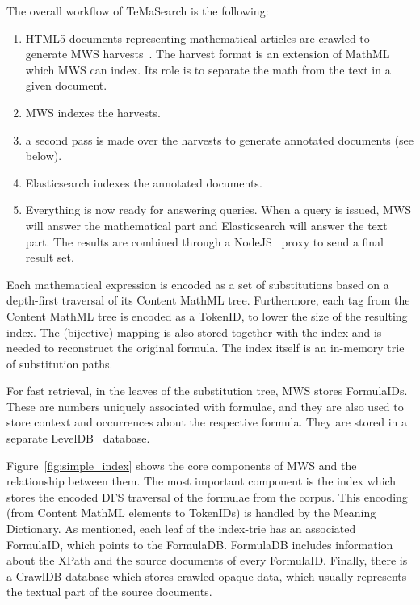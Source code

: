\documentclass[a4paper,oneside]{article}
\def\MWS{\textsf{MWS}\xspace}
\def\tms{\textsf{TeMaSearch}\xspace}
\def\els{\textsf{Elasticsearch}\xspace}
\def\cmml{\textsf{Content MathML}\xspace}
\def\xpath{\textsf{XPath}\xspace}
\def\mathml{\textsf{MathML}\xspace}
\begin{document}
The overall workflow of \tms is the following:
\begin{enumerate}
    \item HTML5 documents representing mathematical articles are
        crawled to generate \MWS harvests~\cite{mwsharvest:online}.
        The \textsf{harvest} format is an extension of \mathml which \MWS can
        index. Its role is to separate the math from the text in a given
        document.
    \item \MWS indexes the harvests.
    \item a second pass is made over the harvests to generate annotated
        documents (see below).
    \item \els indexes the annotated documents.
    \item Everything is now ready for answering queries. When a query is
        issued, \MWS will answer the mathematical part and \els will answer the
        text part.  The results are combined through a
        NodeJS~\cite{nodejs:online} proxy to send a final result set.
\end{enumerate}

Each mathematical expression is encoded as a set of substitutions based
on a depth-first traversal of its \cmml tree.
Furthermore, each tag from the \cmml tree is encoded as a \textsf{TokenID},
to lower the size of the resulting index. The (bijective) mapping is also
stored together with the index and is needed to reconstruct the original
formula. The index itself is an in-memory trie of substitution paths.

For fast retrieval, in the leaves of the substitution tree, \MWS stores
\textsf{FormulaID}s. These are numbers uniquely associated with formulae,
and they are also used to store context and occurrences about the respective
formula. They are stored in a separate LevelDB~\cite{leveldb:online} database.

Figure~\ref{fig:simple_index} shows the core components of \MWS and the
relationship between them. The most important component is the index which
stores the encoded DFS traversal of the formulae from the corpus. This encoding
(from \cmml elements to \textsf{TokenID}s) is handled by the Meaning
Dictionary. As mentioned, each leaf of the index-trie has an associated
\textsf{FormulaID}, which points to the \textsf{FormulaDB}. \textsf{FormulaDB}
includes information about the \xpath and the source documents of every
\textsf{FormulaID}. Finally, there is a \textsf{CrawlDB} database which stores
crawled opaque data, which usually represents the textual part of the source
documents.
\end{document}
